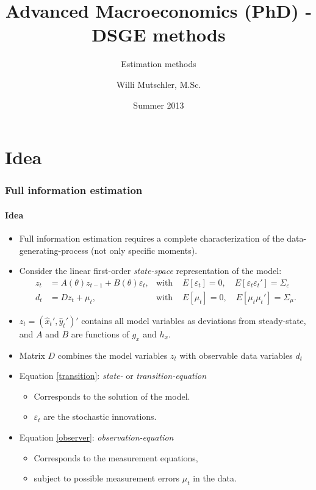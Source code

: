 \documentclass[handout]{beamer}  %
\begin{document}
\author[Willi Mutschler]{Willi Mutschler, M.Sc.}
\date{Summer 2013}
\title[DSGE methods]{Advanced Macroeconomics (PhD) - DSGE methods}
\subtitle{Estimation methods}

\begin{frame}
\titlepage
\end{frame}

\section{Idea}

\begin{frame}\frametitle{Full information estimation}\framesubtitle{Idea}
    \begin{itemize}
      \item Full information estimation requires a complete characterization of the data-generating-process (not only specific moments).
      \item Consider the linear first-order \emph{state-space} representation of the model:
        \begin{align}
        z_t &= A(\theta) {z}_{t-1} + B(\theta) \varepsilon_{t},  &\text{with }& E[\varepsilon_t]= 0,\quad E[\varepsilon_t \varepsilon_t']=\Sigma_\varepsilon \label{transition}\\
        d_t &= D z_t + \mu_t,& \text{with }& E[\mu_t]=0, \quad E[\mu_t \mu_t']= \Sigma_\mu. \label{observer}
        \end{align}
    \item $z_t=(\widehat{x}_t',\widehat{y}_t')'$ contains all model variables as deviations from steady-state, and $A$ and $B$ are functions of $g_x$ and $h_x$.
    \item Matrix $D$ combines the model variables $z_t$ with observable data variables $d_t$
    \item Equation \eqref{transition}: \emph{state-} or \emph{transition-equation}
    \begin{itemize}
      \item Corresponds to the solution of the model.
      \item $\varepsilon_t$ are the stochastic innovations.
    \end{itemize}
    \item Equation \eqref{observer}: \emph{observation-equation}
    \begin{itemize}
      \item Corresponds to the measurement equations,
      \item subject to possible measurement errors $\mu_t$ in the data.
    \end{itemize}
    \end{itemize}
\end{frame}
\end{document}
